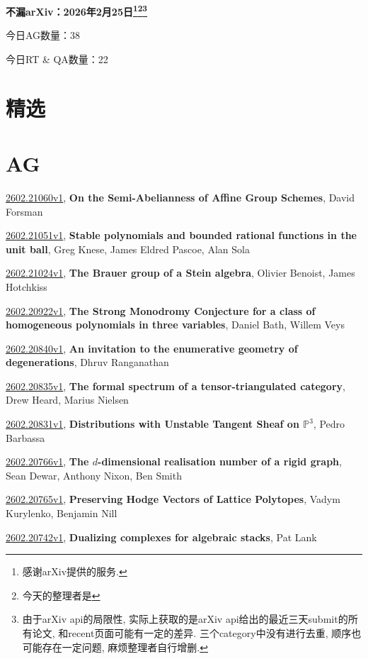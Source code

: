 \documentclass[9pt, a4paper]{article}
\theoremstyle{plain}
\theoremstyle{definition}
\theoremstyle{remark}
\newcommand{\arxiv}[3]{\href{https://arxiv.org/abs/#1}{#1}, \textbf{\textcolor{arxivblue}{#2}}, #3}
\newcommand{\AGnumber}{38}
\newcommand{\RTQAnumber}{22}
\newcommand{\NewestDate}{2026年2月25日}
\newcommand{\todayarXiver}{} %
\begin{document}
\begin{center}
    \Huge\textbf{不漏arXiv：\NewestDate\footnote{感谢arXiv提供的服务.}\footnote{今天的整理者是\todayarXiver}\footnote{由于arXiv api的局限性, 实际上获取的是arXiv api给出的最近三天submit的所有论文, 和recent页面可能有一定的差异. 三个category中没有进行去重, 顺序也可能存在一定问题, 麻烦整理者自行增删.}} \\
\end{center}

\setcounter{section}{-1}

\begin{center}
    今日AG数量：\AGnumber
    
    今日RT \& QA数量：\RTQAnumber
    
\end{center}


\section{精选}


\section{AG}
\arxiv{2602.21060v1}{On the Semi-Abelianness of Affine Group Schemes}{David Forsman}

\arxiv{2602.21051v1}{Stable polynomials and bounded rational functions in the unit ball}{Greg Knese, James Eldred Pascoe, Alan Sola}

\arxiv{2602.21024v1}{The Brauer group of a Stein algebra}{Olivier Benoist, James Hotchkiss}

\arxiv{2602.20922v1}{The Strong Monodromy Conjecture for a class of homogeneous polynomials in three variables}{Daniel Bath, Willem Veys}

\arxiv{2602.20840v1}{An invitation to the enumerative geometry of degenerations}{Dhruv Ranganathan}

\arxiv{2602.20835v1}{The formal spectrum of a tensor-triangulated category}{Drew Heard, Marius Nielsen}

\arxiv{2602.20831v1}{Distributions with Unstable Tangent Sheaf on $\mathbb{P}^3$}{Pedro Barbassa}

\arxiv{2602.20766v1}{The $d$-dimensional realisation number of a rigid graph}{Sean Dewar, Anthony Nixon, Ben Smith}

\arxiv{2602.20765v1}{Preserving Hodge Vectors of Lattice Polytopes}{Vadym Kurylenko, Benjamin Nill}

\arxiv{2602.20742v1}{Dualizing complexes for algebraic stacks}{Pat Lank}
\end{document}
